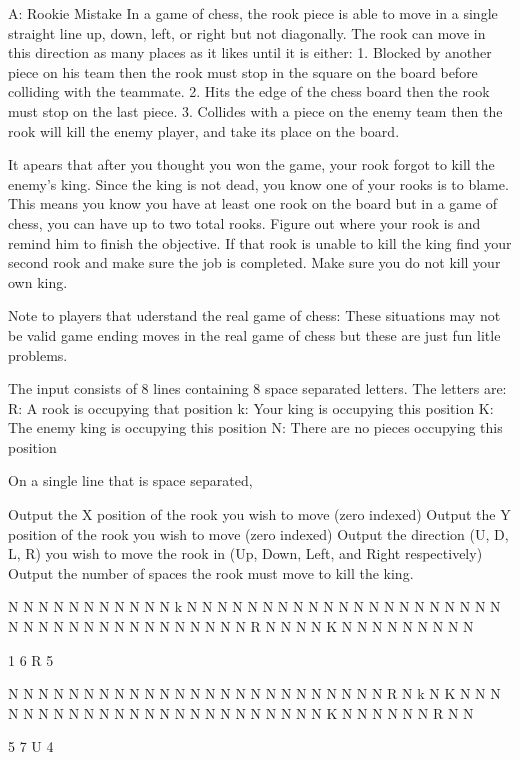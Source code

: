 \begin{problem}{A: Rookie Mistake}
In a game of chess, the rook piece is able to move in a single straight line up, down, left, or right but not diagonally.
The rook can move in this direction as many places as it likes until it is either:
1. Blocked by another piece on his team then the rook must stop in the square on the board before colliding with the teammate.
2. Hits the edge of the chess board then the rook must stop on the last piece.
3. Collides with a piece on the enemy team then the rook will kill the enemy player, and take its place on the board.

It apears that after you thought you won the game, your rook forgot to kill the enemy's king.
Since the king is not dead, you know one of your rooks is to blame.
This means you know you have at least one rook on the board but in a game of chess, you can have up to two total rooks.
Figure out where your rook is and remind him to finish the objective.
If that rook is unable to kill the king find your second rook and make sure the job is completed.
Make sure you do not kill your own king.

Note to players that uderstand the real game of chess: These situations may not be valid game ending moves in the real game of chess but these are just fun litle problems.
\end{problem}

\begin{formalin}
The input consists of 8 lines containing 8 space separated letters.
The letters are:
R: A rook is occupying that position
k: Your king is occupying this position
K: The enemy king is occupying this position
N: There are no pieces occupying this position
\end{formalin}

\begin{formalout}
On a single line that is space separated,

Output the X position of the rook you wish to move (zero indexed)
Output the Y position of the rook you wish to move (zero indexed)
Output the direction (U, D, L, R) you wish to move the rook in (Up, Down, Left, and Right respectively)
Output the number of spaces the rook must move to kill the king.
\end{formalout}

\begin{datain}
N N N N N N N N
N N N k N N N N
N N N N N N N N
N N N N N N N N
N N N N N N N N
N N N N N N N N
N R N N N N K N
N N N N N N N N
\end{datain}
\begin{dataout}
1 6 R 5
\end{dataout}

\begin{datain}
N N N N N N N N
N N N N N N N N
N N N N N N N N
N R N k N K N N
N N N N N N N N
N N N N N N N N
N N N N N N K N
N N N N N R N N
\end{datain}
\begin{dataout}
5 7 U 4
\end{dataout}
